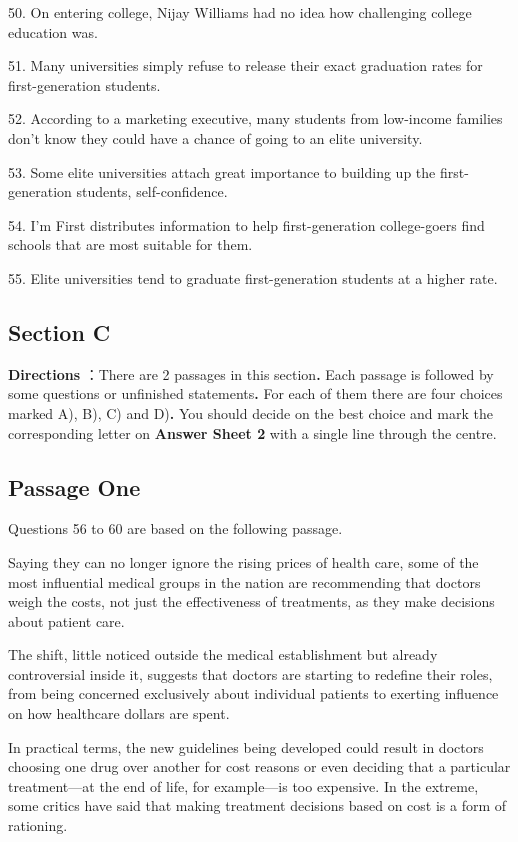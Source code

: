 \documentclass[UTF8,11pt]{ctexart}
\begin{document}
50. On entering college, Nijay Williams had no idea how challenging college education was.


51. Many universities simply refuse to release their exact graduation rates for first-generation students.


52. According to a marketing executive, many students from low-income families don’t know they could have a chance of going to an elite university.


53. Some elite universities attach great importance to building up the first-generation students, self-confidence.


54. I’m First distributes information to help first-generation college-goers find schools that are most suitable for them.


55. Elite universities tend to graduate first-generation students at a higher rate.


\subsection*{\textbf{Section C}}


\textbf{Directions} ：There are 2 passages in this section\textbf{.} Each passage is followed by some questions or unfinished statements\textbf{.} For each of them there are four choices marked A), B), C) and D)\textbf{.} You should decide on the best choice and mark the corresponding letter on\textbf{ Answer Sheet 2} with a single line through the centre.


\subsection*{\textbf{Passage One}}


Questions 56 to 60 are based on the following passage.


Saying they can no longer ignore the rising prices of health care, some of the most influential medical groups in the nation are recommending that doctors weigh the costs, not just the effectiveness of treatments, as they make decisions about patient care.


The shift, little noticed outside the medical establishment but already controversial inside it, suggests that doctors are starting to redefine their roles, from being concerned exclusively about individual patients to exerting influence on how healthcare dollars are spent.


In practical terms, the new guidelines being developed could result in doctors choosing one drug over another for cost reasons or even deciding that a particular treatment—at the end of life, for example—is too expensive. In the extreme, some critics have said that making treatment decisions based on cost is a form of rationing.
\end{document}
